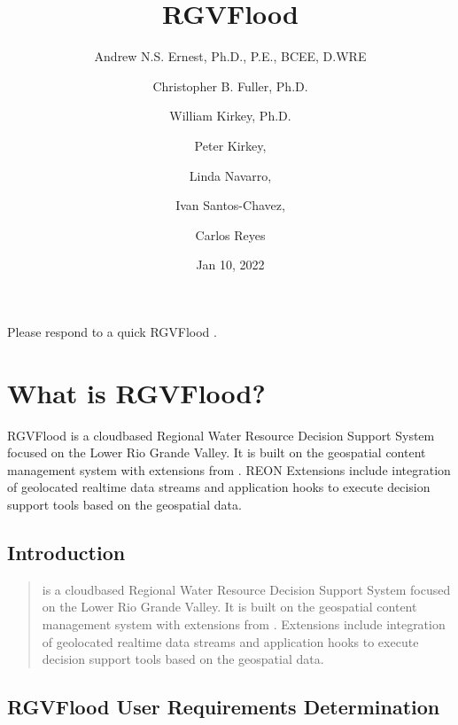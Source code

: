 \documentclass[letterpaper,12pt,english]{book}
\title{RGVFlood}
\date{Jan 10, 2022}
\author{Andrew N.S. Ernest, Ph.D., P.E., BCEE, D.WRE \and Christopher B. Fuller, Ph.D. \and William Kirkey, Ph.D. \and Peter Kirkey, \and Linda Navarro, \and Ivan Santos-Chavez, \and Carlos Reyes}
\begin{document}
\pagestyle{empty}
\sphinxmaketitle
\pagestyle{plain}
\sphinxtableofcontents
\pagestyle{normal}
\label{\detokenize{index::doc}}


\sphinxAtStartPar
Please respond to a quick RGVFlood .


\chapter{What is RGVFlood?}
\label{\detokenize{index:what-is-rgvflood}}
\sphinxAtStartPar
RGVFlood is a cloud\sphinxhyphen{}based Regional Water Resource Decision Support System focused on the Lower Rio Grande Valley. It is built on the  geospatial content management system with extensions from . REON Extensions  include integration of geolocated real\sphinxhyphen{}time data streams and application hooks to execute decision support tools based on the geospatial data.


\section{Introduction}
\label{\detokenize{introduction:introduction}}\label{\detokenize{introduction::doc}}\begin{quote}

\sphinxAtStartPar
{\hyperref[\detokenize{glossary:term-RGVFlood}]{}} is a cloud\sphinxhyphen{}based Regional Water Resource Decision Support System focused on the Lower Rio Grande Valley. It is built on the  geospatial content management system with extensions from . {\hyperref[\detokenize{glossary:term-REON}]{}} Extensions  include integration of geolocated real\sphinxhyphen{}time data streams and application hooks to execute decision support tools based on the geospatial data.
\end{quote}


\section{RGVFlood User Requirements Determination}
\label{\detokenize{requirements/index:rgvflood-user-requirements-determination}}\label{\detokenize{requirements/index::doc}}
\end{document}
